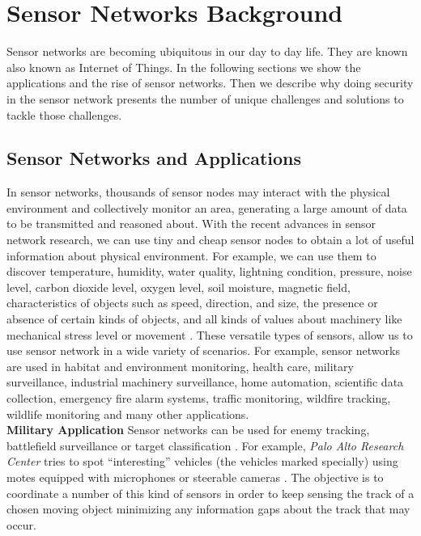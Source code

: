 \chapter{Sensor Networks Background} 
\label{cha:Sensor Networks/Data Aggregation/Security Background}
	Sensor networks are becoming ubiquitous in our day to day life. 
	They are known also known as Internet of Things.
	In the following sections we show the applications and the rise of sensor networks.
	Then we describe why doing security in the sensor network presents the number of unique challenges and solutions to tackle those challenges.

\section{Sensor Networks and Applications}
	In sensor networks, thousands of sensor nodes may interact with the physical environment and collectively monitor an area, generating a large amount of data to be transmitted and reasoned about.
	With the recent advances in sensor network research, we can use tiny and cheap sensor nodes to obtain a lot of useful information about physical environment.
	For example, we can use them to discover temperature, humidity, water quality, lightning condition, pressure, noise level, carbon dioxide level, oxygen level, soil moisture, magnetic field, characteristics of objects such as speed, direction, and size, the presence or absence of certain kinds of objects, and all kinds of values about machinery like mechanical stress level or movement \cite{hof2007applications}.
	These versatile types of sensors, allow us to use sensor network in a wide variety of scenarios.
	For example, sensor networks are used in habitat and environment monitoring, health care, military surveillance, industrial machinery surveillance, home automation, scientific data collection, emergency fire alarm systems, traffic monitoring, wildfire tracking, wildlife monitoring and many other applications.\\
	\textbf{Military Application}
	Sensor networks can be used for enemy tracking, battlefield surveillance or target classification \cite{li2002detection}.
	For example, \textit{Palo Alto Research Center} tries to spot ``interesting'' vehicles (the vehicles marked specially) using motes equipped with microphones or steerable cameras \cite{chu2004distributed}.
	The objective is to coordinate a number of this kind of sensors in order to keep sensing the track of a chosen moving object minimizing any information gaps about the track that may occur.\\
